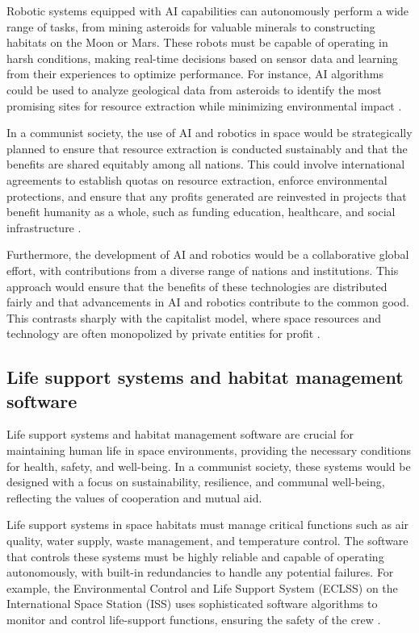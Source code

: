 Robotic systems equipped with AI capabilities can autonomously perform a wide range of tasks, from mining asteroids for valuable minerals to constructing habitats on the Moon or Mars. These robots must be capable of operating in harsh conditions, making real-time decisions based on sensor data and learning from their experiences to optimize performance. For instance, AI algorithms could be used to analyze geological data from asteroids to identify the most promising sites for resource extraction while minimizing environmental impact \cite[pp.~320-322]{sagan1979}.

In a communist society, the use of AI and robotics in space would be strategically planned to ensure that resource extraction is conducted sustainably and that the benefits are shared equitably among all nations. This could involve international agreements to establish quotas on resource extraction, enforce environmental protections, and ensure that any profits generated are reinvested in projects that benefit humanity as a whole, such as funding education, healthcare, and social infrastructure \cite[pp.~90-92]{smith2018}.

Furthermore, the development of AI and robotics would be a collaborative global effort, with contributions from a diverse range of nations and institutions. This approach would ensure that the benefits of these technologies are distributed fairly and that advancements in AI and robotics contribute to the common good. This contrasts sharply with the capitalist model, where space resources and technology are often monopolized by private entities for profit \cite[pp.~150-152]{marx1885}.

\subsection{Life support systems and habitat management software}

Life support systems and habitat management software are crucial for maintaining human life in space environments, providing the necessary conditions for health, safety, and well-being. In a communist society, these systems would be designed with a focus on sustainability, resilience, and communal well-being, reflecting the values of cooperation and mutual aid.

Life support systems in space habitats must manage critical functions such as air quality, water supply, waste management, and temperature control. The software that controls these systems must be highly reliable and capable of operating autonomously, with built-in redundancies to handle any potential failures. For example, the Environmental Control and Life Support System (ECLSS) on the International Space Station (ISS) uses sophisticated software algorithms to monitor and control life-support functions, ensuring the safety of the crew \cite[pp.~255-258]{chris2021}.


